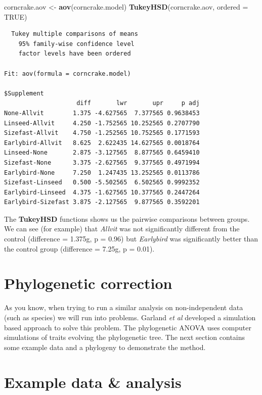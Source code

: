 \documentclass[
]{book}
\newenvironment{Shaded}{\begin{snugshade}}{\end{snugshade}}
\newcommand{\DataTypeTok}[1]{\textcolor[rgb]{0.13,0.29,0.53}{#1}}
\newcommand{\KeywordTok}[1]{\textcolor[rgb]{0.13,0.29,0.53}{\textbf{#1}}}
\newcommand{\NormalTok}[1]{#1}
\newcommand{\OtherTok}[1]{\textcolor[rgb]{0.56,0.35,0.01}{#1}}
\newcommand{\StringTok}[1]{\textcolor[rgb]{0.31,0.60,0.02}{#1}}
\begin{document}
\begin{Shaded}
\begin{Highlighting}[]
\NormalTok{corncrake.aov \textless{}{-}}\StringTok{ }\KeywordTok{aov}\NormalTok{(corncrake.model)}
\KeywordTok{TukeyHSD}\NormalTok{(corncrake.aov, }\DataTypeTok{ordered =} \OtherTok{TRUE}\NormalTok{)}
\end{Highlighting}
\end{Shaded}

\begin{verbatim}
  Tukey multiple comparisons of means
    95% family-wise confidence level
    factor levels have been ordered

Fit: aov(formula = corncrake.model)

$Supplement
                    diff       lwr       upr     p adj
None-Allvit        1.375 -4.627565  7.377565 0.9638453
Linseed-Allvit     4.250 -1.752565 10.252565 0.2707790
Sizefast-Allvit    4.750 -1.252565 10.752565 0.1771593
Earlybird-Allvit   8.625  2.622435 14.627565 0.0018764
Linseed-None       2.875 -3.127565  8.877565 0.6459410
Sizefast-None      3.375 -2.627565  9.377565 0.4971994
Earlybird-None     7.250  1.247435 13.252565 0.0113786
Sizefast-Linseed   0.500 -5.502565  6.502565 0.9992352
Earlybird-Linseed  4.375 -1.627565 10.377565 0.2447264
Earlybird-Sizefast 3.875 -2.127565  9.877565 0.3592201
\end{verbatim}

The \textbf{TukeyHSD} functions shows us the pairwise comparisons between groups. We can see (for example) that \emph{Allvit} was not significantly different from the control (difference = 1.375g, p = 0.96) but \emph{Earlybird} was significantly better than the control group (difference = 7.25g, p = 0.01).

\hypertarget{phylogenetic-correction}{%
\section{Phylogenetic correction}\label{phylogenetic-correction}}

As you know, when trying to run a similar analysis on non-independent data (such as species) we will run into problems. Garland \emph{et al} \citeyearpar{garland93} developed a simulation based approach to solve this problem. The phylogenetic ANOVA uses computer simulations of traits evolving the phylogenetic tree. The next section contains some example data and a phylogeny to demonstrate the method.

\hypertarget{example-data-analysis}{%
\section{Example data \& analysis}\label{example-data-analysis}}
\end{document}
